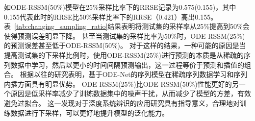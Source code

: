 如ODE-RSSM(50\%)模型在25\%采样比率下的RRSE记录为0.575(0.155)，其中0.155代表此时的RRSE比50\%采样比率下的RRSE（0.421）高出0.155。
表~\ref{tab:changing_sampling_ratio}结果表明将测试集的采样率从25\%提高到50\%会使得预测误差明显下降。
甚至当测试集的采样比率为$50\%$时，ODE-RSSM(25\%)的预测误差甚至低于ODE-RSSM(50\%)。
对于这样的结果，一种可能的原因是当提高测试集的下采样比例时，使用ODE-RSSM(25\%)进行预测的本质是从稀疏的序列数据中学习，然后以更小的时间间隔预测输出，这一过程等价于预测和插值的组合。
根据以往的研究\cite{Yildiz2019}表明，基于ODE-Net的序列模型在稀疏序列数据学习和序列内插方面具有明显优势。
ODE-RSSM(25\%)比ODE-RSSM(50\%)性能更好的另一个原因是低采样率减少了训练数据集中的噪声干扰，从而减少了模型的方差，有效避免过拟合。
这一发现对于深度系统辨识的应用研究具有指导意义，合理地对训练数据进行下采样，可以更好地提升模型的泛化能力。

